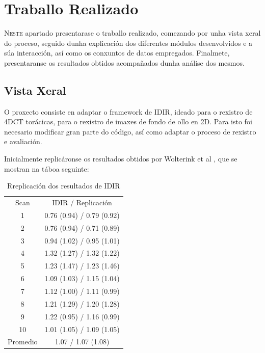 \chapter{Traballo Realizado}
\label{chap:Traballo Realizado}

\lettrine{N}{este} apartado presentarase o traballo realizado, comezando por unha vista xeral do proceso, 
seguido dunha explicación dos diferentes módulos desenvolvidos e a súa interacción, así como os conxuntos de datos empregados.
Finalmete, presentaranse os resultados obtidos acompañados dunha análise dos mesmos.
\section{Vista Xeral}
\label{sec:VistaXeral}

O proxecto consiste en adaptar o framework de IDIR, ideado para o rexistro de \gls{4DCT} torácicas, para o rexistro de imaxes de fondo de ollo en 2D.
Para isto foi necesario modificar gran parte do código, así como adaptar o proceso de rexistro e avaliación.

Inicialmente replicáronse os resultados obtidos por Wolterink et al \cite{wolterink2021implicit}, que se mostran na táboa seguinte:

\begin{table}[ht]
    \centering
    \caption{Rreplicación dos resultados de IDIR}
    \begin{tabular}{c|c}
        Scan & {IDIR / Replicación} \\
        1  & 0.76 (0.94) / 0.79 (0.92) \\
        2  & 0.76 (0.94) / 0.71 (0.89) \\
        3  & 0.94 (1.02) / 0.95 (1.01) \\
        4  & 1.32 (1.27) / 1.32 (1.22) \\
        5  & 1.23 (1.47) / 1.23 (1.46) \\
        6  & 1.09 (1.03) / 1.15 (1.04) \\
        7  & 1.12 (1.00) / 1.11 (0.99) \\
        8  & 1.21 (1.29) / 1.20 (1.28) \\
        9  & 1.22 (0.95) / 1.16 (0.99) \\
        10 & 1.01 (1.05) / 1.09 (1.05) \\
        Promedio & 1.07 / 1.07 (1.08) \\
    \end{tabular}
    \label{tab:comparison}
\end{table}

